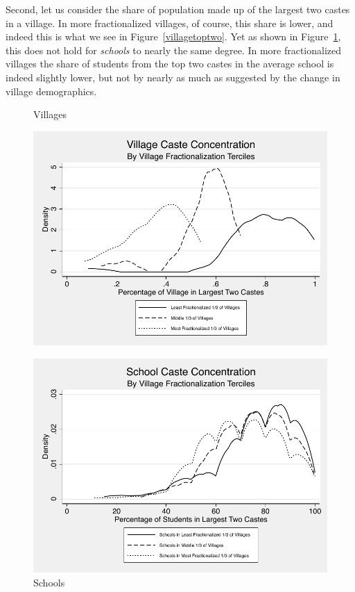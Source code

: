 \documentclass[12pt]{article}
\begin{document}
Second, let us consider the share of population made up of the largest two castes in a village. In more fractionalized villages, of course, this share is lower, and indeed this is what we see in Figure~\ref{villagetoptwo}. Yet as shown in Figure~\ref{schooltoptwo}, this does not hold for \emph{schools} to nearly the same degree. In more fractionalized villages the share of students from the top two castes in the average school is indeed slightly lower, but not by nearly as much as suggested by the change in village demographics.

\begin{figure}[H]
	\begin{center}
			\caption{Villages}\label{villagetoptwo}
			\includegraphics[scale=1]{graphs/village_toptwo.pdf}\caption{Schools}\label{schooltoptwo}\includegraphics[scale=1]{graphs/school_toptwo.pdf}
	\end{center}
\end{figure}
\end{document}
